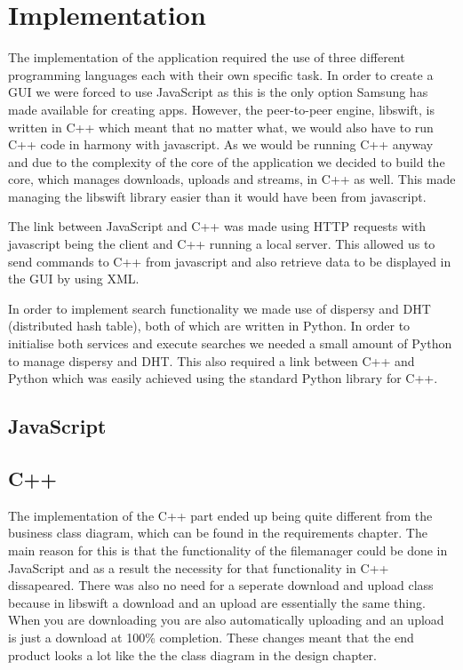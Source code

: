 \chapter{Implementation}

The implementation of the application required the use of three different programming languages each with their own specific task. In order to create a GUI we were forced to use JavaScript as this is the only option Samsung has made available for creating apps. However, the peer-to-peer engine, libswift, is written in C++ which meant that no matter what, we would also have to run C++ code in harmony with javascript. As we would be running C++ anyway and due to the complexity of the core of the application we decided to build the core, which manages downloads, uploads and streams, in C++ as well. This made managing the libswift library easier than it would have been from javascript.

The link between JavaScript and C++ was made using HTTP requests with javascript being the client  and C++ running a local server. This allowed us to send commands to C++ from javascript and also retrieve data to be displayed in the GUI by using XML.

In order to implement search functionality we made use of dispersy and DHT (distributed hash table), both of which are written in Python. In order to initialise both services and execute searches we needed a small amount of Python to manage dispersy and DHT. This also required a link between C++ and Python which was easily achieved using the standard Python library for C++.

\section{JavaScript}

\section{C++}

The implementation of the C++ part ended up being quite different from the business class diagram, which can be found in the requirements chapter. The main reason for this is that the functionality of the filemanager could be done in JavaScript and as a result the necessity for that functionality in C++ dissapeared. There was also no need for a seperate download and upload class because in libswift a download and an upload are essentially the same thing. When you are downloading you are also automatically uploading and an upload is just a download at 100\% completion. These changes meant that the end product looks a lot like the the class diagram in the design chapter.

